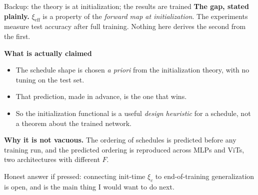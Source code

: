 \documentclass[aspectratio=169,10pt]{beamer}
\newcommand{\scope}[1]{{\footnotesize\color{caveat}#1}}
\begin{document}
\begin{frame}{Backup: the theory is at initialization; the results are trained}
  \begingroup
  \small
  {\color{clay}\bfseries The gap, stated plainly.}
  \(\xi_{\mathrm{eff}}\) is a property of the \emph{forward map at
  initialization}. The experiments measure test accuracy after full
  training. Nothing here derives the second from the first.

  \vspace{0.55em}
  {\color{forest}\bfseries What is actually claimed}
  \begin{itemize}
    \setlength{\itemsep}{0.30em}
    \item The schedule shape is chosen \emph{a priori} from the
      initialization theory, with no tuning on the test set.
    \item That prediction, made in advance, is the one that wins.
    \item So the initialization functional is a useful \emph{design
      heuristic} for a schedule, not a theorem about the trained network.
  \end{itemize}

  \vspace{0.55em}
  {\color{forest}\bfseries Why it is not vacuous.} The ordering of
  schedules is predicted before any training run, and the predicted
  ordering is reproduced across MLPs and ViTs, two architectures with
  different \(F\).

  \vspace{0.45em}
  \scope{Honest answer if pressed: connecting init-time \(\xi_c\) to
  end-of-training generalization is open, and is the main thing I would
  want to do next.}
  \endgroup
\end{frame}
\end{document}

